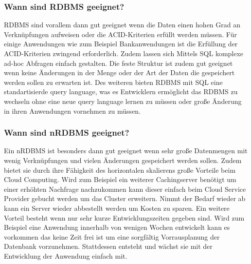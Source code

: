 \documentclass[12pt, a4paper, twoside]{article}
\newcounter{SeitenzahlSpeicher}
\begin{document}
	\subsubsection{Wann sind \ac{RDBMS} geeignet?}
		\ac{RDBMS} sind vorallem dann gut geeignet wenn die Daten einen hohen Grad an Verknüpfungen aufweisen oder die ACID-Kriterien erfüllt werden müssen. Für einige Anwendungen wie zum Beispiel Bankanwendungen ist die Erfüllung der ACID-Kriterien zwingend erforderlich. Zudem lassen sich  Mittels SQL komplexe ad-hoc Abfragen einfach gestalten. Die feste Struktur ist zudem gut geeignet wenn keine Änderungen in der Menge oder der Art der Daten die gespeichert werden sollen zu erwarten ist. Des weiteren bieten \ac{RDBMS} mit SQL eine standartisierde query language, was es Entwicklern ermöglicht das \ac{RDBMS} zu wechseln ohne eine neue query language lernen zu müssen oder große Änderung in ihren Anwendungen vornehmen zu müssen.
		\cite{ibm-sql-nosql}
	\subsubsection{Wann sind \ac{nRDBMS} geeignet?}
		Ein \ac{nRDBMS} ist besonders dann gut geeignet wenn sehr große Datenmengen mit wenig Verknüpfungen und vielen Änderungen gespeichert werden sollen. Zudem bietet sie durch ihre Fähigkeit des horizontalen skalierens große Vorteile beim Cloud Computing. Wird zum Beispiel ein weiterer Cachingserver benötigt um einer erhöhten Nachfrage nachzukommen kann dieser einfach beim Cloud Service Provider gebucht werden um das Cluster erweitern. Nimmt der Bedarf wieder ab kann ein Server wieder abbestellt werden um Kosten zu sparen. Ein weitere Vorteil besteht wenn nur sehr kurze Entwicklungszeiten gegeben sind. Wird zum Beispiel eine Anwendung innerhalb von wenigen Wochen entwickelt kann es vorkommen das keine Zeit frei ist um eine sorgfältig Vorrausplanung der Datenbank vorzunehmen. Stattdessen entsteht und wächst sie mit der Entwicklung der Anwendung einfach mit.
		\cite{ibm-sql-nosql}
\newpage
\clearpage


\end{document}

